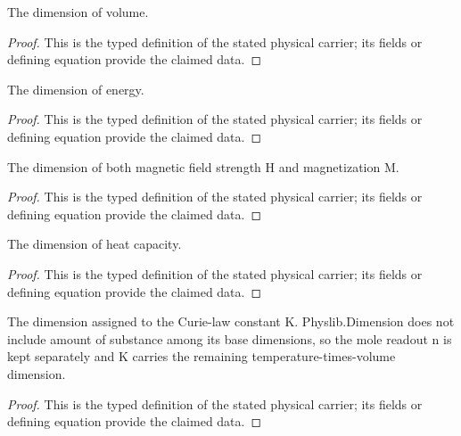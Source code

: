 \begin{definition}
  \label{def:physics:IPhO_2026_3_B_2:aux001}
  The dimension of volume.
\end{definition}
\begin{proof}
  This is the typed definition of the stated physical carrier; its fields or defining equation provide the claimed data.
\end{proof}

\begin{definition}
  \label{def:physics:IPhO_2026_3_B_2:aux002}
  The dimension of energy.
\end{definition}
\begin{proof}
  This is the typed definition of the stated physical carrier; its fields or defining equation provide the claimed data.
\end{proof}

\begin{definition}
  \label{def:physics:IPhO_2026_3_B_2:aux003}
  The dimension of both magnetic field strength H and magnetization M.
\end{definition}
\begin{proof}
  This is the typed definition of the stated physical carrier; its fields or defining equation provide the claimed data.
\end{proof}

\begin{definition}
  \label{def:physics:IPhO_2026_3_B_2:aux004}
  The dimension of heat capacity.
\end{definition}
\begin{proof}
  This is the typed definition of the stated physical carrier; its fields or defining equation provide the claimed data.
\end{proof}

\begin{definition}
  \label{def:physics:IPhO_2026_3_B_2:aux005}
  The dimension assigned to the Curie-law constant K. Physlib.Dimension does not include amount of substance among its base dimensions, so the mole readout n is kept separately and K carries the remaining temperature-times-volume dimension.
\end{definition}
\begin{proof}
  This is the typed definition of the stated physical carrier; its fields or defining equation provide the claimed data.
\end{proof}

